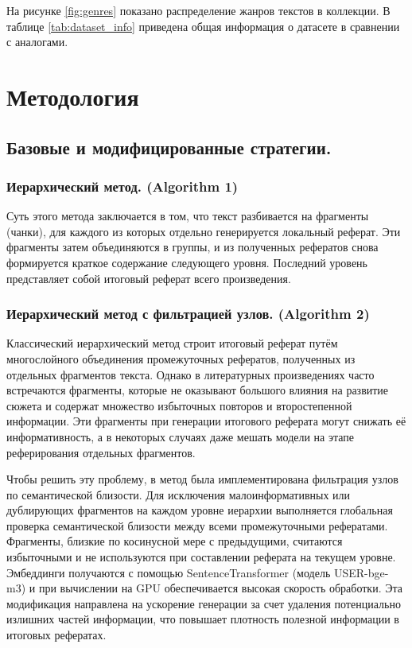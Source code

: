 \documentclass{superfri}
\begin{document}
На рисунке \ref{fig:genres} показано распределение жанров текстов в коллекции. В таблице \ref{tab:dataset_info} приведена общая информация о датасете в сравнении с аналогами.

\section{Методология}
\subsection{Базовые и модифицированные стратегии.}

\subsubsection{Иерархический метод. (Algorithm 1)}
Суть этого метода \cite{hierarchical} заключается в том, что текст разбивается на фрагменты (чанки), для каждого из
которых отдельно генерируется локальный реферат. 
Эти фрагменты затем объединяются в группы, и из полученных рефератов снова формируется краткое содержание
следующего уровня. Последний уровень представляет собой итоговый реферат всего произведения.

\subsubsection{Иерархический метод с фильтрацией узлов. (Algorithm 2)}
Классический иерархический метод строит итоговый реферат путём многослойного объединения промежуточных рефератов, полученных из отдельных фрагментов текста. 
Однако в литературных произведениях часто встречаются фрагменты, которые не оказывают большого влияния на развитие сюжета и содержат множество избыточных
повторов и второстепенной информации. Эти фрагменты при генерации итогового реферата могут снижать её информативность, а в некоторых случаях даже мешать модели на этапе реферирования отдельных фрагментов.

Чтобы решить эту проблему, в метод была имплементирована фильтрация узлов по семантической близости. 
Для исключения малоинформативных или дублирующих фрагментов на каждом уровне иерархии выполняется глобальная проверка семантической близости между всеми промежуточными рефератами. 
Фрагменты, близкие по косинусной мере с предыдущими, считаются избыточными и не используются при составлении реферата на текущем уровне.
Эмбеддинги получаются с помощью SentenceTransformer (модель USER-bge-m3) и при вычислении на GPU обеспечивается высокая скорость обработки.
Эта модификация направлена на ускорение генерации за счет удаления потенциально излишних частей информации, что повышает плотность полезной информации в итоговых рефератах. 
\end{document}
